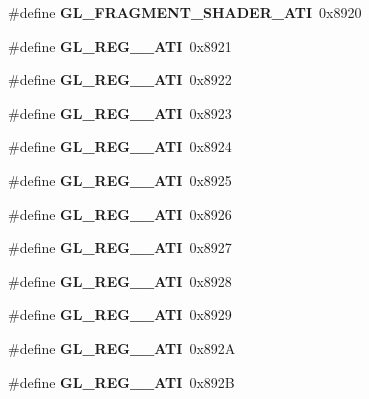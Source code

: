 \begin{DoxyCompactItemize}
\item 
\#define {\bfseries G\+L\+\_\+\+F\+R\+A\+G\+M\+E\+N\+T\+\_\+\+S\+H\+A\+D\+E\+R\+\_\+\+A\+T\+I}~0x8920\label{_s_d_l__opengl_8h_af7dde0c98eaa8622272531f54113d05f}

\item 
\#define {\bfseries G\+L\+\_\+\+R\+E\+G\+\_\+\_\+\+A\+T\+I}~0x8921\label{_s_d_l__opengl_8h_ae605a0f343021e90edaec14a31998614}

\item 
\#define {\bfseries G\+L\+\_\+\+R\+E\+G\+\_\+\_\+\+A\+T\+I}~0x8922\label{_s_d_l__opengl_8h_aef6238b0189a7b228d4c5fb6161891e8}

\item 
\#define {\bfseries G\+L\+\_\+\+R\+E\+G\+\_\+\_\+\+A\+T\+I}~0x8923\label{_s_d_l__opengl_8h_a4d633cde66076eccf978eaf674f75e62}

\item 
\#define {\bfseries G\+L\+\_\+\+R\+E\+G\+\_\+\_\+\+A\+T\+I}~0x8924\label{_s_d_l__opengl_8h_a69a573463c4582e0a75034286bad7488}

\item 
\#define {\bfseries G\+L\+\_\+\+R\+E\+G\+\_\+\_\+\+A\+T\+I}~0x8925\label{_s_d_l__opengl_8h_a86af736bf8d31f047eaaa8defff60739}

\item 
\#define {\bfseries G\+L\+\_\+\+R\+E\+G\+\_\+\_\+\+A\+T\+I}~0x8926\label{_s_d_l__opengl_8h_a6b6304c5d934789c20aec6a9a9c0c46e}

\item 
\#define {\bfseries G\+L\+\_\+\+R\+E\+G\+\_\+\_\+\+A\+T\+I}~0x8927\label{_s_d_l__opengl_8h_a9ef01ad070d06c76c600b78b0dc62c5a}

\item 
\#define {\bfseries G\+L\+\_\+\+R\+E\+G\+\_\+\_\+\+A\+T\+I}~0x8928\label{_s_d_l__opengl_8h_a285d1d5a5cc3a717a7c75d748ed52ae1}

\item 
\#define {\bfseries G\+L\+\_\+\+R\+E\+G\+\_\+\_\+\+A\+T\+I}~0x8929\label{_s_d_l__opengl_8h_a88d3aecf09313e2212c025c7e85df98a}

\item 
\#define {\bfseries G\+L\+\_\+\+R\+E\+G\+\_\+\_\+\+A\+T\+I}~0x892\+A\label{_s_d_l__opengl_8h_a8bd7523fe809796d3b13597898c376fc}

\item 
\#define {\bfseries G\+L\+\_\+\+R\+E\+G\+\_\+\_\+\+A\+T\+I}~0x892\+B\label{_s_d_l__opengl_8h_a2cc369b1560beac245aa6904a888c14d}


\end{DoxyCompactItemize}
